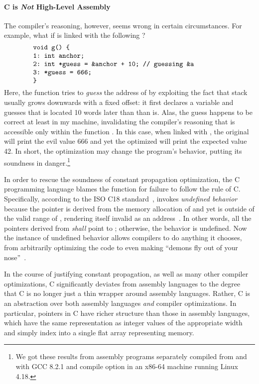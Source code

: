 \paragraph{C is \emph{Not} High-Level Assembly}

The compiler's reasoning, however, seems wrong in certain circumstances.  For example, what if
 is linked with the following ?
%
\[
\begin{minipage}{0.8\textwidth}
\begin{verbatim}
void g() {
1: int anchor;
2: int *guess = &anchor + 10; // guessing &a
3: *guess = 666;
}
\end{verbatim}
\end{minipage}
\]
%
\noindent Here, the function  tries to \emph{guess} the address of  by exploiting
the fact that stack usually grows downwards with a fixed offset: it first declares a variable
 and guesses that  is located 10 words later than than  is.  Alas,
the guess happens to be correct at least in my machine, invalidating the compiler's reasoning that
 is accessible only within the function .  In this case, when linked with
, the original  will print the evil value 666 and yet the optimized 
will print the expected value 42.  In short, the optimization may change the program's behavior,
putting its soundness in danger.\footnote{We got these results from assembly programs separately
  compiled from  and  with GCC 8.2.1 and compile option
   in an x86-64 machine running Linux 4.18.}

In order to rescue the soundness of constant propagation optimization, the C programming language
blames the function  for failure to follow the rule of C.  Specifically, according to the
ISO C18 standard~\cite{c18},  invokes \emph{undefined behavior}~\cite[\S3.4.3p1]{c18}
because the pointer  is derived from the memory allocation of  and yet is
outside of the valid range of , rendering itself invalid as an
address~\cite[\S6.5.6p8]{c18}.  In other words, all the pointers derived from 
\emph{shall} point to ; otherwise, the behavior is undefined.  Now the instance of
undefined behavior allows compilers to do anything it chooses, from arbitrarily optimizing the code
to even making ``demons fly out of your nose''~\cite{nasal-demons}.

In the course of justifying constant propagation, as well as many other compiler optimizations, C
significantly deviates from assembly languages to the degree that C is no longer just a thin wrapper
around assembly languages.  Rather, C is an abstraction over both assembly languages \emph{and}
compiler optimizations.  In particular, pointers in C have richer structure than those in assembly
languages, which have the same representation as integer values of the appropriate width and simply
index into a single flat array representing memory.

